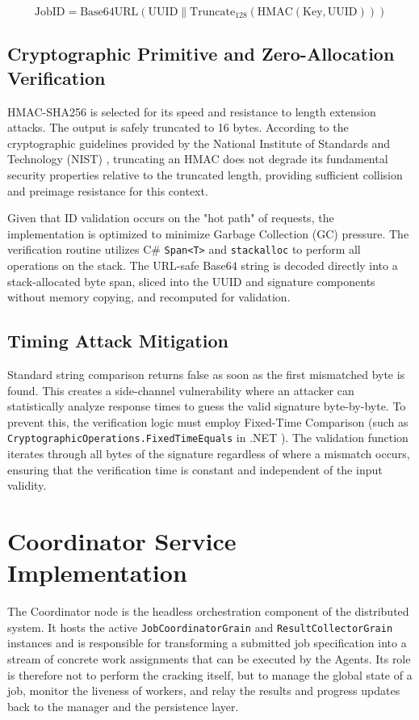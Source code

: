 $$ \text{JobID} = \text{Base64URL}(\text{UUID} \parallel \text{Truncate}_{128}(\text{HMAC}(\text{Key}, \text{UUID}))) $$

\subsection{Cryptographic Primitive and Zero-Allocation Verification}
HMAC-SHA256 is selected for its speed and resistance to length extension attacks. The output is safely truncated to 16 bytes. According to the cryptographic guidelines provided by the National Institute of Standards and Technology (NIST) \cite{nist_hash_functions}, truncating an HMAC does not degrade its fundamental security properties relative to the truncated length, providing sufficient collision and preimage resistance for this context.

Given that ID validation occurs on the "hot path" of requests, the implementation is optimized to minimize Garbage Collection (GC) pressure. The verification routine utilizes C\# \verb|Span<T>| and \verb|stackalloc| to perform all operations on the stack. The URL-safe Base64 string is decoded directly into a stack-allocated byte span, sliced into the UUID and signature components without memory copying, and recomputed for validation.

\subsection{Timing Attack Mitigation}
Standard string comparison returns false as soon as the first mismatched byte is found. This creates a side-channel vulnerability where an attacker can statistically analyze response times to guess the valid signature byte-by-byte. To prevent this, the verification logic must employ Fixed-Time Comparison (such as \verb|CryptographicOperations.FixedTimeEquals| in .NET \cite{dotnet_fixedtimeequals}). The validation function iterates through all bytes of the signature regardless of where a mismatch occurs, ensuring that the verification time is constant and independent of the input validity.



\section{Coordinator Service Implementation}

The Coordinator node is the headless orchestration component of the distributed system. It hosts the active \verb|JobCoordinatorGrain| and \verb|ResultCollectorGrain| instances and is responsible for transforming a submitted job specification into a stream of concrete work assignments that can be executed by the Agents. Its role is therefore not to perform the cracking itself, but to manage the global state of a job, monitor the liveness of workers, and relay the results and progress updates back to the manager and the persistence layer.

